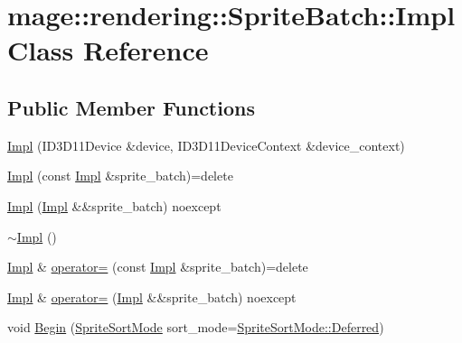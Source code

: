 \hypertarget{classmage_1_1rendering_1_1_sprite_batch_1_1_impl}{}\section{mage\+:\+:rendering\+:\+:Sprite\+Batch\+:\+:Impl Class Reference}
\label{classmage_1_1rendering_1_1_sprite_batch_1_1_impl}
\subsection*{Public Member Functions}
\begin{DoxyCompactItemize}
\item 
\mbox{\hyperlink{classmage_1_1rendering_1_1_sprite_batch_1_1_impl_a47a62c120c2de8cb56eba5fb0ca8939f}{Impl}} (I\+D3\+D11\+Device \&device, I\+D3\+D11\+Device\+Context \&device\+\_\+context)
\item 
\mbox{\hyperlink{classmage_1_1rendering_1_1_sprite_batch_1_1_impl_aad1ca6d0f48c541dceb5f428d89be10b}{Impl}} (const \mbox{\hyperlink{classmage_1_1rendering_1_1_sprite_batch_1_1_impl}{Impl}} \&sprite\+\_\+batch)=delete
\item 
\mbox{\hyperlink{classmage_1_1rendering_1_1_sprite_batch_1_1_impl_a0f9d79fb3a897c1365f5e15a1eaf01f9}{Impl}} (\mbox{\hyperlink{classmage_1_1rendering_1_1_sprite_batch_1_1_impl}{Impl}} \&\&sprite\+\_\+batch) noexcept
\item 
\mbox{\hyperlink{classmage_1_1rendering_1_1_sprite_batch_1_1_impl_a32ea1f2a4d1f11c19594e1d4eaa36f6c}{$\sim$\+Impl}} ()
\item 
\mbox{\hyperlink{classmage_1_1rendering_1_1_sprite_batch_1_1_impl}{Impl}} \& \mbox{\hyperlink{classmage_1_1rendering_1_1_sprite_batch_1_1_impl_abcbbd766f6b1355e5d015cbdcaacfc07}{operator=}} (const \mbox{\hyperlink{classmage_1_1rendering_1_1_sprite_batch_1_1_impl}{Impl}} \&sprite\+\_\+batch)=delete
\item 
\mbox{\hyperlink{classmage_1_1rendering_1_1_sprite_batch_1_1_impl}{Impl}} \& \mbox{\hyperlink{classmage_1_1rendering_1_1_sprite_batch_1_1_impl_a46daa28e38d091e3d9050dca282b90aa}{operator=}} (\mbox{\hyperlink{classmage_1_1rendering_1_1_sprite_batch_1_1_impl}{Impl}} \&\&sprite\+\_\+batch) noexcept
\item 
void \mbox{\hyperlink{classmage_1_1rendering_1_1_sprite_batch_1_1_impl_a4a7442fe888c97768a427fc35448e1d1}{Begin}} (\mbox{\hyperlink{namespacemage_1_1rendering_a4fad00dbca0c8d854c765ab831c76055}{Sprite\+Sort\+Mode}} sort\+\_\+mode=\mbox{\hyperlink{namespacemage_1_1rendering_aeb14ce7610cc9391f4e01be027b91dcca4ed71db54748b36eeb398876b0c747ac}{Sprite\+Sort\+Mode\+::\+Deferred}})

\end{DoxyCompactItemize}
